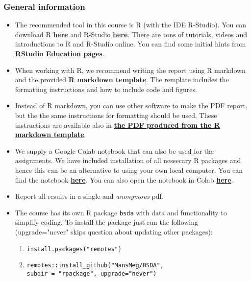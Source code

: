 
\subsubsection*{General information}


\begin{itemize}

\item The recommended tool in this course is R (with the IDE R-Studio). You can download R \href{https://cran.r-project.org/}{\textbf{here}} and R-Studio \href{https://www.rstudio.com/products/rstudio/download/}{\textbf{here}}. There are tons of tutorials, videos and introductions to R and R-Studio online. You can find some initial hints from \href{https://education.rstudio.com/}{\textbf{RStudio Education pages}}.
\item When working with R, we recommend writing the report using R markdown and the provided \href{https://github.com/MansMeg/BSDA/blob/main/templates/assignment_template.rmd}{\textbf{R markdown template}}.
The remplate includes the formatting instructions and how to include code and figures.
\item Instead of R markdown, you can use other software to make the PDF report, but the the same instructions for formatting should be used. These instructions are available also in \href{https://github.com/MansMeg/BSDA/blob/main/templates/assignment_template.pdf}{\textbf{the PDF produced from the R markdown template}}.
\item We supply a Google Colab notebook that can also be used for the assignments. We have included installation of all nessecary R packages and hence this can be an alternative to using your own local computer. You can find the notebook \href{https://github.com/MansMeg/BSDA/blob/main/templates/bsda_colab_template.ipynb}{\textbf{here}}. You can also open the notebook in Colab \href{https://colab.research.google.com/github/MansMeg/BSDA/blob/main/templates/bsda_colab_template.ipynb}{\textbf{here}}.
\item Report all results in a single and \emph{anonymous} pdf.
\item The course has its own R package \texttt{bsda} with data and functionality to simplify coding. To install the package just run the following (upgrade="never" skips question about updating other packages):
\begin{enumerate}
\item \texttt{install.packages("remotes")}
\item \texttt{remotes::install\_github("MansMeg/BSDA", \\ subdir = "rpackage", upgrade="never")}

\end{enumerate}
\end{itemize}
